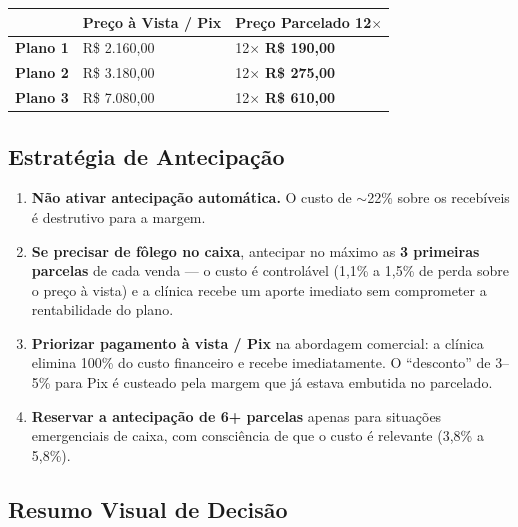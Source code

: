 \documentclass[12pt, a4paper]{article}
\newcommand{\reais}[1]{R\$ #1}
\begin{document}
\begin{table}[H]
    \centering
    \Large
    \renewcommand{\arraystretch}{1.8}
    \begin{tabularx}{\textwidth}{c X X}
        \toprule
        \rowcolor{tableHeader} & \textbf{Preço à Vista / Pix} & \textbf{Preço Parcelado 12$\times$} \\
        \midrule
        \textbf{Plano 1} & \reais{2.160,00} & 12$\times$ \textbf{\reais{190,00}} \\
        \rowcolor{lightGray}
        \textbf{Plano 2} & \reais{3.180,00} & 12$\times$ \textbf{\reais{275,00}} \\
        \textbf{Plano 3} & \reais{7.080,00} & 12$\times$ \textbf{\reais{610,00}} \\
        \bottomrule
    \end{tabularx}
\end{table}

\subsection{Estratégia de Antecipação}

\begin{enumerate}
    \item \textcolor{dangerRed}{\textbf{Não ativar antecipação automática.}} O custo de $\sim$22\% sobre os recebíveis é destrutivo para a margem.

    \item \textcolor{successGreen}{\textbf{Se precisar de fôlego no caixa}}, antecipar no máximo as \textbf{3 primeiras parcelas} de cada venda — o custo é controlável (1,1\% a 1,5\% de perda sobre o preço à vista) e a clínica recebe um aporte imediato sem comprometer a rentabilidade do plano.

    \item \textcolor{successGreen}{\textbf{Priorizar pagamento à vista / Pix}} na abordagem comercial: a clínica elimina 100\% do custo financeiro e recebe imediatamente. O ``desconto'' de 3--5\% para Pix é custeado pela margem que já estava embutida no parcelado.

    \item \textcolor{warningOrange}{\textbf{Reservar a antecipação de 6+ parcelas}} apenas para situações emergenciais de caixa, com consciência de que o custo é relevante (3,8\% a 5,8\%).
\end{enumerate}

\subsection{Resumo Visual de Decisão}
\end{document}
